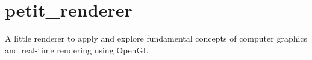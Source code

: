 \chapter{petit\+\_\+renderer }
\hypertarget{md_README}{}\label{md_README}
\label{md_README_autotoc_md0}%
%


A little renderer to apply and explore fundamental concepts of computer graphics and real-\/time rendering using Open\+GL 